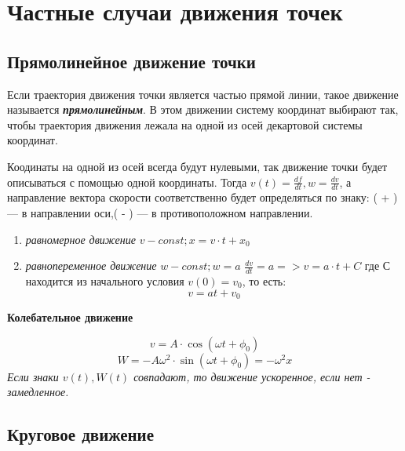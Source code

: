 \section{Частные случаи движения точек}
\subsection{Прямолинейное движение точки}
  Если траектория движения точки является частью прямой линии, такое движение называется \textbf{\textit{прямолинейным}}. В этом движении систему координат выбирают так, чтобы траектория движения лежала на одной из осей декартовой системы координат.

\vspace{5px}

Коодинаты на одной из осей всегда будут нулевыми, так движение точки будет описываться с помощью одной координаты. Тогда $ v(t) = \frac{df}{dt}, w =\frac{dv}{dt}$,  а направление вектора скорости соответственно будет определяться по знаку: ( + ) --- в направлении оси,( - ) --- в противоположном направлении.
\begin{enumerate}
    \item \textit{равномерное движение} $v - const; x = v \cdot t + x_0 $
    \item \textit{равнопеременное движение} $w - const; w = a$
          $\frac{dv}{dt} = a => v = a \cdot t + C $ где С находится из начального условия $v(0) = v_0$, то есть:
          \[ v = at+v_0\]
\end{enumerate}

\vspace{10px}

\textbf{Колебательное движение}

\[ v = A \cdot \cos{(\omega t+ \phi_0)}\]
\[ W = -A\omega ^2 \cdot \sin{(\omega t+\phi_0)} = -\omega^2x \]
\textit{Если знаки $v(t) , W(t)$ совпадают, то движение ускоренное, если нет - замедленное.}
\subsection{Круговое движение}



